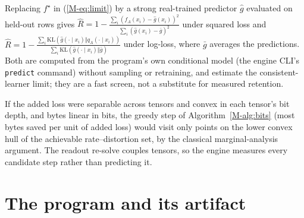 \documentclass[10pt,letterpaper]{article}
\begin{document}
\begin{remark}
Replacing $f^\star$ in (\ref{M-eq:limit}) by a strong real-trained predictor $\hat g$ evaluated on held-out
rows gives $\hat R=1-\frac{\sum_i(f_A(x_i)-\hat g(x_i))^2}{\sum_i(\hat g(x_i)-\bar g)^2}$ under squared loss and
$\hat R=1-\frac{\sum_i\mathrm{KL}(\hat g(\cdot\mid x_i)\Vert q_A(\cdot\mid x_i))}{\sum_i\mathrm{KL}(\hat g(\cdot\mid x_i)\Vert\bar g)}$ under
log-loss, where $\bar g$ averages the predictions. Both are computed from the program's own conditional model
(the engine CLI's \texttt{predict} command) without sampling or retraining, and estimate the consistent-learner limit; they
are a fast screen, not a substitute for measured retention.
\end{remark}

\begin{remark}
If the added loss were separable across tensors and convex in each tensor's bit depth, and bytes linear
in bits, the greedy step of Algorithm~\ref{M-alg:bits} (most bytes saved per unit of added loss) would visit only
points on the lower convex hull of the achievable rate--distortion set, by the classical marginal-analysis
argument. The readout re-solve couples tensors, so the engine measures every candidate step rather than
predicting it.
\end{remark}

\section{The program and its artifact}
\label{app:artifact}
\end{document}

